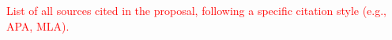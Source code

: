 \documentclass[12pt]{article}
\begin{document}
\printbibliography

\textcolor{red}{List of all sources cited in the proposal, following a specific citation style (e.g., APA, MLA).}


\end{document}

